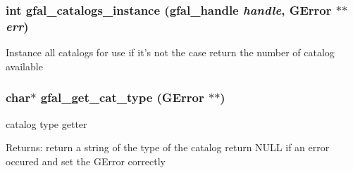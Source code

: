 \subsubsection{\setlength{\rightskip}{0pt plus 5cm}int gfal\_\-catalogs\_\-instance (gfal\_\-handle {\em handle}, GError $\ast$$\ast$ {\em err})}\label{gfal__common__catalog_8h_d272f75eb549a72064524ecce3c25fe7}


Instance all catalogs for use if it's not the case return the number of catalog available 
\subsubsection{\setlength{\rightskip}{0pt plus 5cm}char$\ast$ gfal\_\-get\_\-cat\_\-type (GError $\ast$$\ast$)}\label{gfal__common__catalog_8h_791ad55a9c8aaca0bb8ae74a3538c202}


catalog type getter 

\begin{Desc}
\item[Returns:]return a string of the type of the catalog return NULL if an error occured and set the GError correctly \end{Desc}
